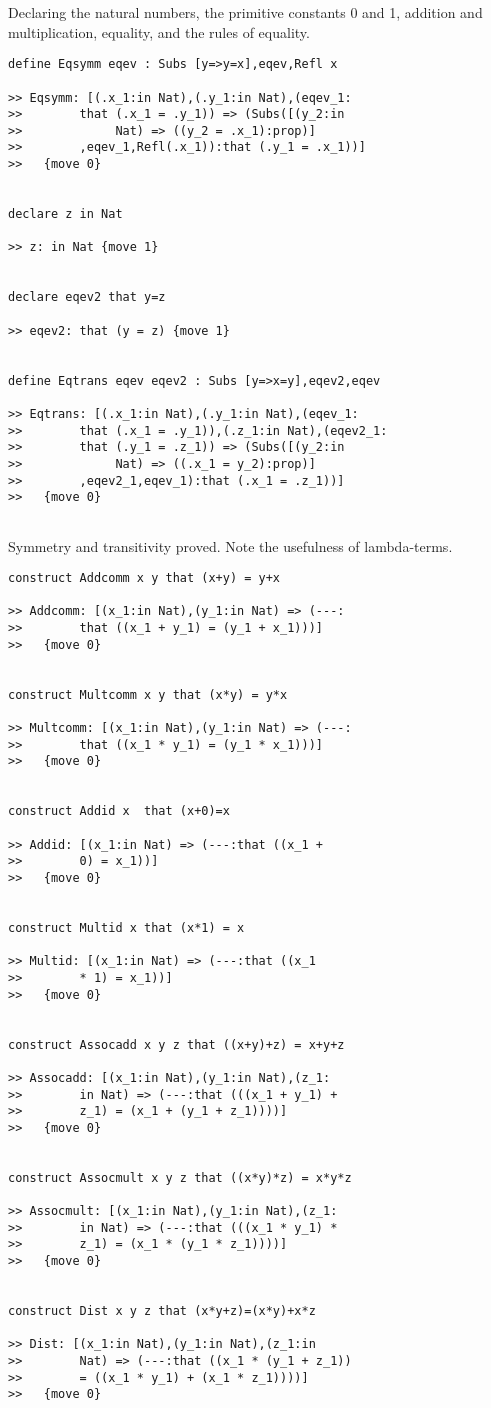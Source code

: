 \documentclass{article}
\begin{document}
Declaring the natural numbers, the primitive constants 0 and 1, addition and multiplication, equality, and the rules of equality.

\begin{verbatim}
define Eqsymm eqev : Subs [y=>y=x],eqev,Refl x

>> Eqsymm: [(.x_1:in Nat),(.y_1:in Nat),(eqev_1:
>>        that (.x_1 = .y_1)) => (Subs([(y_2:in 
>>             Nat) => ((y_2 = .x_1):prop)]
>>        ,eqev_1,Refl(.x_1)):that (.y_1 = .x_1))]
>>   {move 0}


declare z in Nat

>> z: in Nat {move 1}


declare eqev2 that y=z

>> eqev2: that (y = z) {move 1}


define Eqtrans eqev eqev2 : Subs [y=>x=y],eqev2,eqev

>> Eqtrans: [(.x_1:in Nat),(.y_1:in Nat),(eqev_1:
>>        that (.x_1 = .y_1)),(.z_1:in Nat),(eqev2_1:
>>        that (.y_1 = .z_1)) => (Subs([(y_2:in 
>>             Nat) => ((.x_1 = y_2):prop)]
>>        ,eqev2_1,eqev_1):that (.x_1 = .z_1))]
>>   {move 0}


\end{verbatim}

Symmetry and transitivity proved.  Note the usefulness of lambda-terms.

\begin{verbatim}
construct Addcomm x y that (x+y) = y+x

>> Addcomm: [(x_1:in Nat),(y_1:in Nat) => (---:
>>        that ((x_1 + y_1) = (y_1 + x_1)))]
>>   {move 0}


construct Multcomm x y that (x*y) = y*x

>> Multcomm: [(x_1:in Nat),(y_1:in Nat) => (---:
>>        that ((x_1 * y_1) = (y_1 * x_1)))]
>>   {move 0}


construct Addid x  that (x+0)=x

>> Addid: [(x_1:in Nat) => (---:that ((x_1 + 
>>        0) = x_1))]
>>   {move 0}


construct Multid x that (x*1) = x

>> Multid: [(x_1:in Nat) => (---:that ((x_1 
>>        * 1) = x_1))]
>>   {move 0}


construct Assocadd x y z that ((x+y)+z) = x+y+z

>> Assocadd: [(x_1:in Nat),(y_1:in Nat),(z_1:
>>        in Nat) => (---:that (((x_1 + y_1) + 
>>        z_1) = (x_1 + (y_1 + z_1))))]
>>   {move 0}


construct Assocmult x y z that ((x*y)*z) = x*y*z

>> Assocmult: [(x_1:in Nat),(y_1:in Nat),(z_1:
>>        in Nat) => (---:that (((x_1 * y_1) * 
>>        z_1) = (x_1 * (y_1 * z_1))))]
>>   {move 0}


construct Dist x y z that (x*y+z)=(x*y)+x*z

>> Dist: [(x_1:in Nat),(y_1:in Nat),(z_1:in 
>>        Nat) => (---:that ((x_1 * (y_1 + z_1)) 
>>        = ((x_1 * y_1) + (x_1 * z_1))))]
>>   {move 0}


\end{verbatim}
\end{document}
